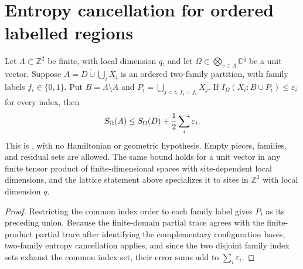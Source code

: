 \section{Entropy cancellation for ordered labelled regions}

\begin{theorem}
    \label{thm:area_law_two_family_entropy}
    \leanok
    Let $\Lambda\subset\mathbb Z^2$ be finite, with local dimension $q$, and let
    $\Omega\in\bigotimes_{v\in\Lambda}\mathbb C^q$ be a unit vector. Suppose
    $A=D\mathbin{\dot\cup}\bigcup_iX_i$ is an ordered two-family partition, with
    family labels $f_i\in\{0,1\}$. Put $B=\Lambda\setminus A$ and
    $P_i=\bigcup_{j<i,\,f_j=f_i}X_j$.
    If $I_\Omega(X_i:B\cup P_i)\le\varepsilon_i$ for every index, then
    \begin{align}
        S_\Omega(A)\le S_\Omega(D)+\frac12\sum_i\varepsilon_i.
        \notag
    \end{align}
    This is \cite[Lemma~11.1]{OpenAI2026AreaLaw}, with no Hamiltonian or
    geometric hypothesis. Empty pieces, families, and residual sets are allowed.
    The same bound holds for a unit vector in any finite tensor product of
    finite-dimensional spaces with site-dependent local dimensions, and the
    lattice statement above specializes it to sites in $\mathbb Z^2$ with
    local dimension $q$.
\end{theorem}
\begin{proof}\leanok
    Restricting the common index order to each family label gives $P_i$ as its
    preceding union. Because the finite-domain partial trace agrees with the
    finite-product partial trace after identifying the complementary
    configuration bases, two-family entropy cancellation applies, and since the
    two disjoint family index sets exhaust the common index set, their error
    sums add to $\sum_i\varepsilon_i$.
\end{proof}
